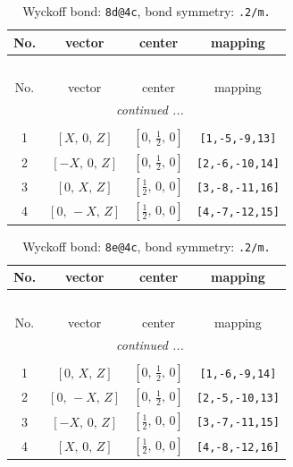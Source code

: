 \documentclass[fleqn,8pt]{jsarticle}
\begin{document}
\begin{longtable}{cccc}
\caption{Wyckoff bond: {\tt 8d@4c}, bond symmetry: {\tt .2/m.}}
 \\
 \hline \hline
No. & vector & center & mapping \\ \hline \endfirsthead

\multicolumn{3}{l}{\tablename\ \thetable{}} \\
 \hline \hline
No. & vector & center & mapping \\ \hline \endhead

 \hline \hline
\multicolumn{3}{r}{\footnotesize\it continued ...} \\ \endfoot

 \hline \hline
\multicolumn{3}{r}{} \\ \endlastfoot

1 & $\left[ X,\, 0,\, Z \right]$ & $\left[ 0,\, \frac{1}{2},\, 0 \right]$ & {\tt [1,-5,-9,13]} \\ \hline
2 & $\left[ - X,\, 0,\, Z \right]$ & $\left[ 0,\, \frac{1}{2},\, 0 \right]$ & {\tt [2,-6,-10,14]} \\ \hline
3 & $\left[ 0,\, X,\, Z \right]$ & $\left[ \frac{1}{2},\, 0,\, 0 \right]$ & {\tt [3,-8,-11,16]} \\ \hline
4 & $\left[ 0,\, - X,\, Z \right]$ & $\left[ \frac{1}{2},\, 0,\, 0 \right]$ & {\tt [4,-7,-12,15]} \\
\end{longtable}
\renewcommand{\arraystretch}{1.2}
\begin{longtable}{cccc}
\caption{Wyckoff bond: {\tt 8e@4c}, bond symmetry: {\tt .2/m.}}
 \\
 \hline \hline
No. & vector & center & mapping \\ \hline \endfirsthead

\multicolumn{3}{l}{\tablename\ \thetable{}} \\
 \hline \hline
No. & vector & center & mapping \\ \hline \endhead

 \hline \hline
\multicolumn{3}{r}{\footnotesize\it continued ...} \\ \endfoot

 \hline \hline
\multicolumn{3}{r}{} \\ \endlastfoot

1 & $\left[ 0,\, X,\, Z \right]$ & $\left[ 0,\, \frac{1}{2},\, 0 \right]$ & {\tt [1,-6,-9,14]} \\ \hline
2 & $\left[ 0,\, - X,\, Z \right]$ & $\left[ 0,\, \frac{1}{2},\, 0 \right]$ & {\tt [2,-5,-10,13]} \\ \hline
3 & $\left[ - X,\, 0,\, Z \right]$ & $\left[ \frac{1}{2},\, 0,\, 0 \right]$ & {\tt [3,-7,-11,15]} \\ \hline
4 & $\left[ X,\, 0,\, Z \right]$ & $\left[ \frac{1}{2},\, 0,\, 0 \right]$ & {\tt [4,-8,-12,16]} \\
\end{longtable}
\end{document}
